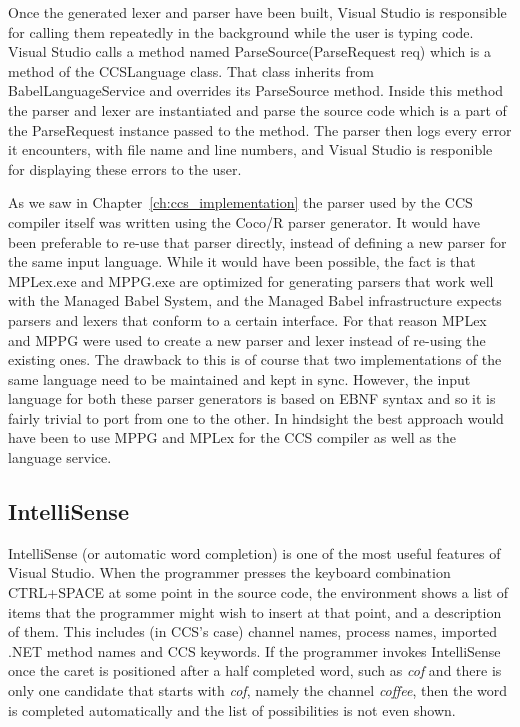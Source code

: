 	Once the generated lexer and parser have been built, Visual Studio is 
	responsible for calling them repeatedly in the background while the user is 
	typing code. Visual Studio calls a method named 
	\textsf{ParseSource(ParseRequest req)} which is a method of the 
	\textsf{CCSLanguage} class. That class inherits from 
	\textsf{BabelLanguageService} and overrides its \textsf{ParseSource} 
	method. Inside this method the parser and lexer are instantiated and parse 
	the source code which is a part of the \textsf{ParseRequest} instance passed 
	to the method. The parser then logs every error it encounters, with file 
	name and line numbers, and Visual Studio is responible for displaying these 
	errors to the user.

	As we saw in Chapter~\ref{ch:ccs_implementation} the parser used by the CCS 
	compiler itself was written using the Coco/R parser generator. It would have 
	been preferable to re-use that parser directly, instead of defining a new 
	parser for the same input language. While it would have been possible, the 
	fact is that MPLex.exe and MPPG.exe are optimized for generating parsers 
	that work well with the Managed Babel System, and the Managed Babel 
	infrastructure expects parsers and lexers that conform to a certain 
	interface. For that reason MPLex and MPPG were used to create a new parser 
	and lexer instead of re-using the existing ones. The drawback to this is of 
	course that two implementations of the same language need to be maintained 
	and kept in sync. However, the input language for both these parser 
	generators is based on EBNF syntax and so it is fairly trivial to port from 
	one to the other. In hindsight the best approach would have been to use MPPG 
	and MPLex for the CCS compiler as well as the language service.
	
	\subsection{IntelliSense}
	IntelliSense (or automatic word completion) is one of the most useful 
	features of Visual Studio. When the programmer presses the keyboard 
	combination CTRL+SPACE at some point in the source code, the environment 
	shows a list of items that the programmer might wish to insert at that 
	point, and a description of them. This includes (in CCS's case) channel 
	names, process names, imported .NET method names and CCS keywords. If the 
	programmer invokes IntelliSense once the caret is positioned after a half 
	completed word, such as \textit{cof} and there is only one candidate that 
	starts with \textit{cof}, namely the channel \textit{coffee}, then the word 
	is completed automatically and the list of possibilities is not even shown.
	
